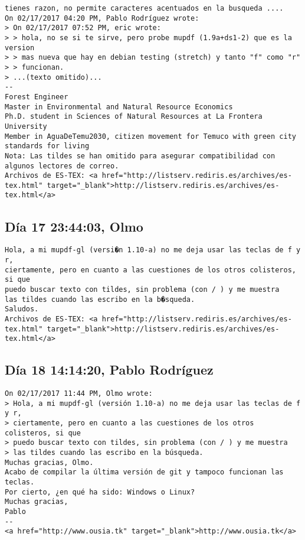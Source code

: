 \documentclass[a4paper,10pt]{article}
\begin{document}
\begin{lstlisting}
tienes razon, no permite caracteres acentuados en la busqueda ....
On 02/17/2017 04:20 PM, Pablo Rodríguez wrote:
> On 02/17/2017 07:52 PM, eric wrote:
> > hola, no se si te sirve, pero probe mupdf (1.9a+ds1-2) que es la version
> > mas nueva que hay en debian testing (stretch) y tanto "f" como "r"
> > funcionan.
> ...(texto omitido)...
-- 
Forest Engineer
Master in Environmental and Natural Resource Economics
Ph.D. student in Sciences of Natural Resources at La Frontera University
Member in AguaDeTemu2030, citizen movement for Temuco with green city standards for living
Nota: Las tildes se han omitido para asegurar compatibilidad con algunos lectores de correo.
Archivos de ES-TEX: <a href="http://listserv.rediris.es/archives/es-tex.html" target="_blank">http://listserv.rediris.es/archives/es-tex.html</a>

\end{lstlisting}

\subsection{Día 17 23:44:03, Olmo}

\begin{lstlisting}
Hola, a mi mupdf-gl (versi�n 1.10-a) no me deja usar las teclas de f y r,
ciertamente, pero en cuanto a las cuestiones de los otros colisteros, si que
puedo buscar texto con tildes, sin problema (con / ) y me muestra
las tildes cuando las escribo en la b�squeda.
Saludos.
Archivos de ES-TEX: <a href="http://listserv.rediris.es/archives/es-tex.html" target="_blank">http://listserv.rediris.es/archives/es-tex.html</a>

\end{lstlisting}

\subsection{Día 18 14:14:20, Pablo Rodríguez}

\begin{lstlisting}
On 02/17/2017 11:44 PM, Olmo wrote:
> Hola, a mi mupdf-gl (versión 1.10-a) no me deja usar las teclas de f y r,
> ciertamente, pero en cuanto a las cuestiones de los otros colisteros, si que
> puedo buscar texto con tildes, sin problema (con / ) y me muestra
> las tildes cuando las escribo en la búsqueda.
Muchas gracias, Olmo.
Acabo de compilar la última versión de git y tampoco funcionan las teclas.
Por cierto, ¿en qué ha sido: Windows o Linux?
Muchas gracias,
Pablo
-- 
<a href="http://www.ousia.tk" target="_blank">http://www.ousia.tk</a>

\end{lstlisting}
\end{document}
